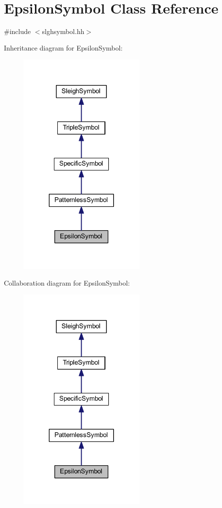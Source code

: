 \hypertarget{class_epsilon_symbol}{}\section{Epsilon\+Symbol Class Reference}
\label{class_epsilon_symbol}


{\ttfamily \#include $<$slghsymbol.\+hh$>$}



Inheritance diagram for Epsilon\+Symbol\+:
\nopagebreak
\begin{figure}[H]
\begin{center}
\leavevmode
\includegraphics[width=179pt]{class_epsilon_symbol__inherit__graph}
\end{center}
\end{figure}


Collaboration diagram for Epsilon\+Symbol\+:
\nopagebreak
\begin{figure}[H]
\begin{center}
\leavevmode
\includegraphics[width=179pt]{class_epsilon_symbol__coll__graph}
\end{center}
\end{figure}
